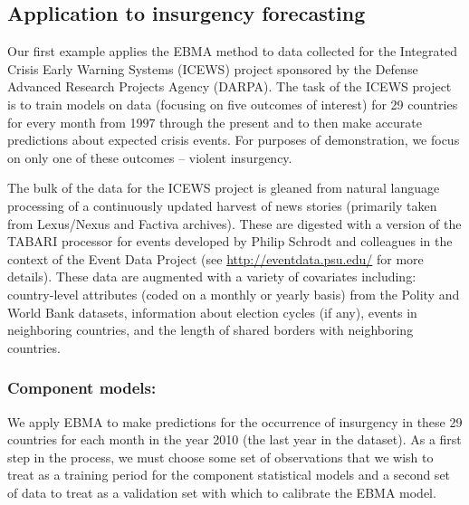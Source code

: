 \subsection{Application to insurgency forecasting}

Our first example applies the EBMA method to data collected for the
Integrated Crisis Early Warning Systems (ICEWS) project sponsored by
the Defense Advanced Research Projects Agency (DARPA).  The task of
the ICEWS project is to train models on data (focusing on five
outcomes of interest) for 29 countries for every month from 1997
through the present and to then make accurate predictions about
expected crisis events.  For purposes of demonstration, we focus on only
one of these outcomes -- violent insurgency.

The bulk of the data for the ICEWS project is gleaned from natural
language processing of a continuously updated harvest of news stories
(primarily taken from Lexus/Nexus and Factiva archives). These are
digested with a version of the TABARI processor for events developed
by Philip Schrodt and colleagues in the context of the Event Data
Project (see \url{http://eventdata.psu.edu/} for more details).  These
data are augmented with a variety of covariates including:
country-level attributes (coded on a monthly or yearly basis) from the
Polity and World Bank datasets, information about election cycles (if
any), events in neighboring countries, and the length of shared
borders with neighboring countries.

\subsubsection{Component models:}

We apply EBMA to make predictions for the occurrence of insurgency in
these 29 countries for each month in the year 2010 (the last year in
the dataset). As a first step in the process, we must choose some set
of observations that we wish to treat as a training period for the
component statistical models and a second set of data to treat as a
validation set with which to calibrate the EBMA model.

